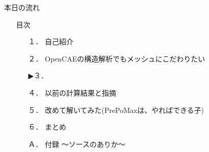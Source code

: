 \begin{frame}{本日の流れ}
  \begin{itemize}
      \item[] 目次
    \begin{enumerate}[label=\textbf{ \arabic*.},itemsep=1.3ex, leftmargin=1cm]
        \item[１．] 自己紹介
        \item[２．] OpenCAEの構造解析でもメッシュにこだわりたい
        \item[▶３．] 
        \item[４．] 以前の計算結果と指摘
        \item[５．] 改めて解いてみた(PrePoMaxは、やればできる子)
        \item[６．] まとめ
        \item[Ａ．] 付録 ～ソースのありか～
    \end{enumerate}
  \end{itemize}
\end{frame}
